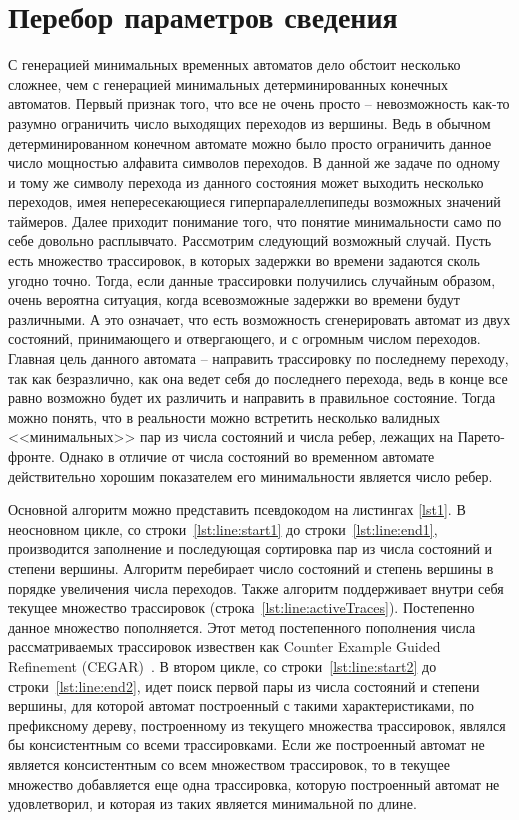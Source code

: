 \documentclass[times,specification,annotation]{itmo-student-thesis}
\begin{document}
\section{Перебор параметров сведения}
С генерацией минимальных временных автоматов дело обстоит несколько сложнее, чем с генерацией минимальных детерминированных конечных автоматов.
Первый признак того, что все не очень просто -- невозможность как-то разумно ограничить число выходящих переходов из вершины. Ведь в обычном детерминированном конечном автомате можно
было просто ограничить данное число мощностью алфавита символов переходов. В данной же задаче по одному и тому же символу перехода из данного состояния может выходить несколько
переходов, имея непересекающиеся гиперпаралеллепипеды возможных значений таймеров.
Далее приходит понимание того, что понятие минимальности само по себе довольно расплывчато. Рассмотрим следующий возможный случай. 
Пусть есть множество трассировок, в которых задержки во времени задаются сколь угодно точно. Тогда, если данные трассировки получились случайным образом,
очень вероятна ситуация, когда всевозможные задержки во времени будут различными. А это означает, что есть возможность сгенерировать автомат из двух состояний, принимающего и отвергающего,
и с огромным числом переходов. Главная цель данного автомата -- направить трассировку по последнему переходу, так как безразлично, как она ведет себя до последнего перехода, ведь в
конце все равно возможно будет их различить и направить в правильное состояние. Тогда можно понять, что в реальности можно встретить несколько валидных <<минимальных>> пар из числа
состояний и числа ребер, лежащих на Парето-фронте. 
Однако в отличие от числа состояний во временном автомате действительно хорошим показателем его минимальности является число ребер.

Основной алгоритм можно представить псевдокодом на листингах \ref{lst1}.
В неосновном цикле, со строки~\ref{lst:line:start1} до строки~\ref{lst:line:end1}, производится заполнение и последующая сортировка
пар из числа состояний и степени вершины. Алгоритм перебирает число состояний и степень вершины в порядке увеличения числа переходов. 
Также алгоритм поддерживает внутри себя текущее множество трассировок (строка~\ref{lst:line:activeTraces}). Постепенно данное множество пополняется.
Этот метод постепенного пополнения числа рассматриваемых трассировок извествен как Counter Example Guided Refinement (CEGAR)~\cite{cegar}.
В втором цикле, со строки~\ref{lst:line:start2} до строки~\ref{lst:line:end2}, идет поиск первой пары из числа состояний и степени вершины,
для которой автомат построенный с такими характеристиками, по префиксному дереву, построенному из текущего множества трассировок,
являлся бы консистентным со всеми трассировками. Если же построенный автомат не является консистентным со
всем множеством трассировок, то в текущее множество добавляется еще одна трассировка, которую построенный автомат не удовлетворил, и которая из таких является минимальной по длине.
\end{document}
